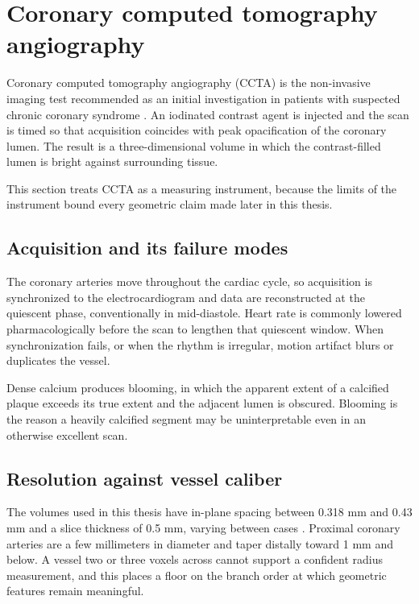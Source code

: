 \section{Coronary computed tomography angiography}
\label{sec:ccta}

Coronary computed tomography angiography (CCTA) is the non-invasive imaging test recommended
as an initial investigation in patients with suspected chronic coronary syndrome
\cite{knuuti2019esc}.
An iodinated contrast agent is injected and the scan is timed so that acquisition coincides
with peak opacification of the coronary lumen.
The result is a three-dimensional volume in which the contrast-filled lumen is bright against
surrounding tissue.

This section treats CCTA as a measuring instrument, because the limits of the instrument
bound every geometric claim made later in this thesis.

\subsection{Acquisition and its failure modes}

The coronary arteries move throughout the cardiac cycle, so acquisition is synchronized to
the electrocardiogram and data are reconstructed at the quiescent phase, conventionally in
mid-diastole.
Heart rate is commonly lowered pharmacologically before the scan to lengthen that quiescent
window.
When synchronization fails, or when the rhythm is irregular, motion artifact blurs or
duplicates the vessel.

Dense calcium produces blooming, in which the apparent extent of a calcified plaque exceeds
its true extent and the adjacent lumen is obscured.
Blooming is the reason a heavily calcified segment may be uninterpretable even in an
otherwise excellent scan.

\subsection{Resolution against vessel caliber}

The volumes used in this thesis have in-plane spacing between 0.318 mm and 0.43 mm and a
slice thickness of 0.5 mm, varying between cases \cite{zeng2023imagecas}.
Proximal coronary arteries are a few millimeters in diameter and taper distally toward 1 mm
and below.
A vessel two or three voxels across cannot support a confident radius measurement, and this
places a floor on the branch order at which geometric features remain meaningful.

